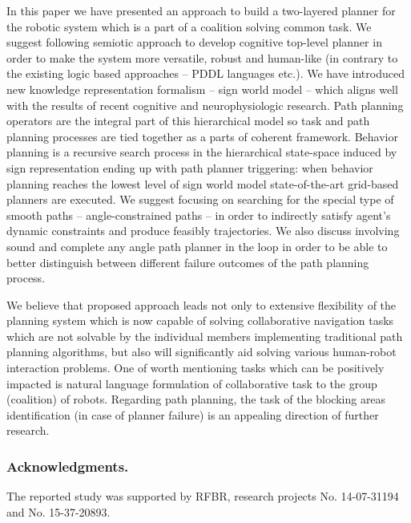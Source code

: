 \documentclass[runningheads,a4paper]{llncs}
\begin{document}
In this paper we have presented an approach to build a two-layered planner for the robotic system which is a part of a coalition solving common task. We suggest following semiotic approach to develop cognitive top-level planner in order to make the system more versatile, robust and human-like (in contrary to the existing logic based approaches – PDDL languages etc.). We have introduced new knowledge representation formalism – sign world model – which aligns well with the results of recent cognitive and neurophysiologic research. Path planning operators are the integral part of this hierarchical model so task and path planning processes are tied together as a parts of coherent framework. Behavior planning is a recursive search process in the hierarchical state-space induced by sign representation ending up with path planner triggering: when behavior planning reaches the lowest level of sign world model state-of-the-art grid-based planners are executed. We suggest focusing on searching for the special type of smooth paths – angle-constrained paths – in order to indirectly satisfy agent's dynamic constraints and produce feasibly trajectories. We also discuss involving sound and complete any angle path planner in the loop in order to be able to better distinguish between different failure outcomes of the path planning process.

We believe that proposed approach leads not only to extensive flexibility of the planning system which is now capable of solving collaborative navigation tasks which are not solvable by the individual members implementing traditional path planning algorithms, but also will significantly aid solving various human-robot interaction problems. One of worth mentioning tasks which can be positively impacted is natural language formulation of collaborative task to the group (coalition) of robots. Regarding path planning, the task of the blocking areas identification (in case of planner failure) is an appealing direction of further research.


\subsubsection*{Acknowledgments.} The reported study was supported by RFBR, research projects No. 14-07-31194 and No. 15-37-20893.
\end{document}
